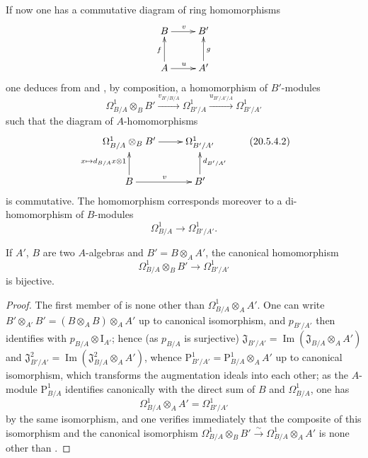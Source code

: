 \begin{env}[20.5.4]
\label{0.20.5.4}
If now one has a commutative diagram of ring homomorphisms
\[
\xymatrix{
  B \ar[r]^v & B' \\
  A \ar[u]^f \ar[r]^u & A' \ar[u]_g
}
\]
one deduces from  and , by composition, a homomorphism of $B'$-modules
\begin{equation}
\tag{20.5.4.1}
  \label{0.20.5.4.1}
  \Omega^1_{B/A}\otimes_B B'\xrightarrow{v_{B'/B/A}}\Omega^1_{B'/A}\xrightarrow{u_{B'/A'/A}}\Omega^1_{B'/A'}
\end{equation}
such that the diagram of $A$-homomorphisms
\[
\xymatrix{
  \Omega^1_{B/A}\otimes_B B' \ar[r] & \Omega^1_{B'/A'} \\
  B \ar[u]^{x\mapsto d_{B/A}x\otimes 1} \ar[r]^v & B' \ar[u]_{d_{B'/A'}}
}
\tag{20.5.4.2}
  \label{0.20.5.4.2}
\]
is commutative.
The homomorphism  corresponds moreover to a di-homomorphism of $B$-modules
\begin{equation}
\tag{20.5.4.3}
  \label{0.20.5.4.3}
  \Omega^1_{B/A}\to\Omega^1_{B'/A'}.
\end{equation}
\end{env}

\begin{proposition}[20.5.5]
\label{0.20.5.5}
If $A'$, $B$ are two $A$-algebras and $B'=B\otimes_A A'$, the canonical homomorphism 
\begin{equation}
\tag{20.5.5.1}
  \label{0.20.5.5.1}
  \Omega^1_{B/A}\otimes_B B'\to\Omega^1_{B'/A'}
\end{equation}
is bijective.
\end{proposition}

\begin{proof}
The first member of  is none other than $\Omega^1_{B/A}\otimes_A A'$.
One can write $B'\otimes_{A'}B'=(B\otimes_A B)\otimes_A A'$ up to canonical isomorphism, and $p_{B'/A'}$ then identifies with $p_{B/A}\otimes\mathrm{I}_{A'}$; hence (as $p_{B/A}$ is surjective) $\mathfrak{J}_{B'/A'}=\operatorname{Im}(\mathfrak{J}_{B/A}\otimes_A A')$ and $\mathfrak{J}^2_{B'/A'}=\operatorname{Im}(\mathfrak{J}^2_{B/A}\otimes_A A')$, whence $\mathrm{P}^1_{B'/A'}=\mathrm{P}^1_{B/A}\otimes_A A'$ up to canonical isomorphism, which transforms the augmentation ideals into each other; as the $A$-module $\mathrm{P}^1_{B/A}$ identifies canonically with the direct sum of $B$ and $\Omega^1_{B/A}$, one has
\begin{equation}
\tag{20.5.5.2}
  \label{0.20.5.5.2}
  \Omega^1_{B/A}\otimes_A A' = \Omega^1_{B'/A'}
\end{equation}
by the same isomorphism, and one verifies immediately that the composite of this isomorphism and the canonical isomorphism $\Omega^1_{B/A}\otimes_B B'\xrightarrow{\sim}\Omega^1_{B/A}\otimes_A A'$ is none other than .
\end{proof}


